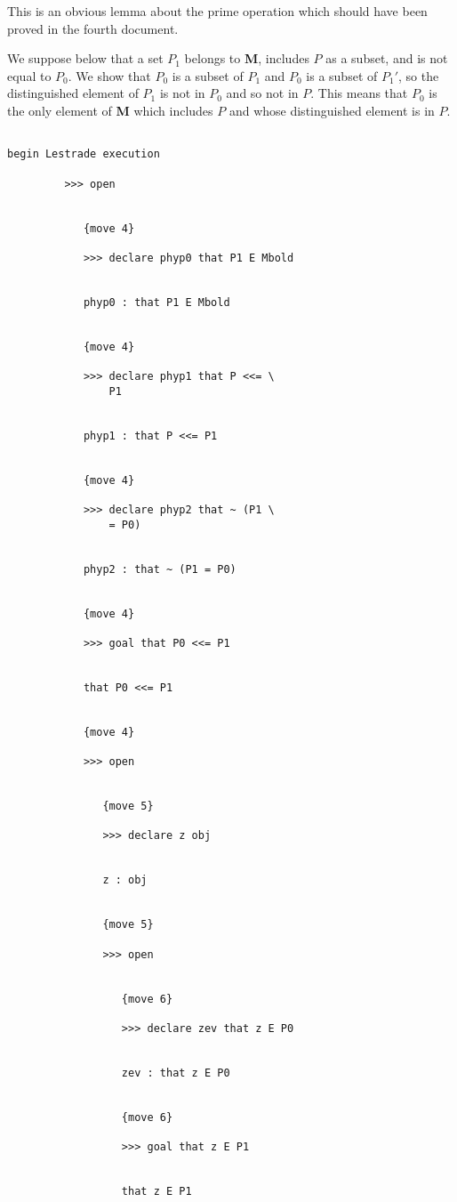 \documentclass[12pt]{article}
\begin{document}
This is an obvious lemma about the prime operation which should have been proved in the fourth document.  

We suppose below that a set $P_1$ belongs to {\bf M}, includes $P$ as a subset, and is not equal to $P_0$.  We show that $P_0$ is a subset of $P_1$
and $P_0$ is a subset of $P_1'$, so the distinguished element of $P_1$ is not in $P_0$ and so not in $P$.  This means that $P_0$ is the only element of {\bf M} which includes $P$ and whose distinguished element is in $P$.

\begin{verbatim}

begin Lestrade execution

         >>> open


            {move 4}

            >>> declare phyp0 that P1 E Mbold


            phyp0 : that P1 E Mbold


            {move 4}

            >>> declare phyp1 that P <<= \
                P1


            phyp1 : that P <<= P1


            {move 4}

            >>> declare phyp2 that ~ (P1 \
                = P0)


            phyp2 : that ~ (P1 = P0)


            {move 4}

            >>> goal that P0 <<= P1


            that P0 <<= P1


            {move 4}

            >>> open


               {move 5}

               >>> declare z obj


               z : obj


               {move 5}

               >>> open


                  {move 6}

                  >>> declare zev that z E P0


                  zev : that z E P0


                  {move 6}

                  >>> goal that z E P1


                  that z E P1



\end{verbatim}
\end{document}
